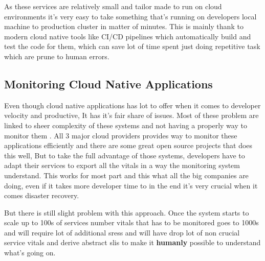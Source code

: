 As these services are relatively small and tailor made to run on cloud environments it's very easy to take something that's running on developers local machine to production cluster in matter of minutes. This is mainly thank to modern cloud native tools like CI/CD pipelines which automatically build and test the code for them, which can save lot of time spent just doing repetitive task which are prune to human errors. \citep{Whataret68:online}

\subsection{Monitoring Cloud Native Applications} \label{monitoring-bg}
Even though cloud native applications has lot to offer when it comes to developer velocity and productive, It has it's fair share of issues. Most of these problem are linked to sheer complexity of these systems and not having a properly way to monitor them \citep{5WaysYou35:online}. All 3 major cloud providers provides way to monitor these applications efficiently and there are some great open source projects that does this well, But to take the full advantage of those systems, developers have to adapt their services to export all the vitals in a way the monitoring system understand. This works for most part and this what all the big companies are doing, even if it takes more developer time to in the end it's very crucial when it comes disaster recovery.

But there is still slight problem with this approach. Once the system starts to scale up to 100s of services number vitals that has to be monitored goes to 1000s and will require lot of additional \acp{sres} and will have drop lot of non crucial service vitals and derive abstract \acp{sli} to make it \textbf{humanly} possible to understand what's going on.
